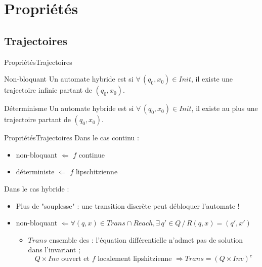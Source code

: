 \documentclass[compress]{beamer}
\begin{document}
\section{Propriétés}
\begin{frame}
\tableofcontents[currentsection]
\end{frame}

\subsection{Trajectoires}
\begin{frame}{Propriétés}{Trajectoires}
\begin{block}{Non-bloquant}
Un automate hybride est  si $\forall \, (q_0, x_0) \in Init$, il existe une trajectoire infinie partant de $(q_0, x_0)$.
\end{block}
\begin{block}{Déterminisme}
Un automate hybride est  si $\forall \, (q_0, x_0) \in Init$, il existe au plus une trajectoire  partant de $(q_0, x_0)$.
\end{block}
\end{frame}

\begin{frame}{Propriétés}{Trajectoires}
Dans le cas continu :
\begin{itemize}
\item non-bloquant $\Leftarrow$ $f$ continue
\item déterministe $\Leftarrow$ $f$ lipschitzienne
\end{itemize}
Dans le cas hybride :
\begin{itemize}
\item Plus de "souplesse" : une transition discrète peut débloquer l'automate !
\item non-bloquant 
	$\Leftarrow \forall (q, x) \in Trans \cap Reach, \exists \, q' \in Q \, / \, R(q, x) = (q', x')$
	\begin{itemize}
	\item $Trans$ ensemble des  : l'équation différentielle n'admet pas de solution dans l'invariant ;
	$$Q \times Inv \mbox{ ouvert et } f \mbox{ localement lipshitzienne } \Rightarrow Trans = (Q \times Inv)^c$$
	\end{itemize}
\end{itemize} 
\end{frame}
\end{document}
